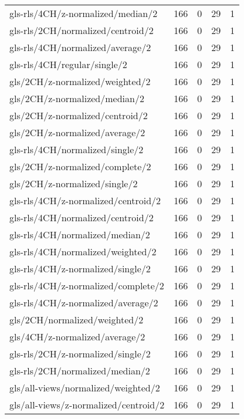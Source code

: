 \begin{longtable}{lrrrr}
    gls-rls/4CH/z-normalized/median/2         & 166 &  0 & 29 &  1 \\
    gls-rls/2CH/normalized/centroid/2         & 166 &  0 & 29 &  1 \\
    gls-rls/4CH/normalized/average/2          & 166 &  0 & 29 &  1 \\
    gls-rls/4CH/regular/single/2              & 166 &  0 & 29 &  1 \\
    gls/2CH/z-normalized/weighted/2           & 166 &  0 & 29 &  1 \\
    gls/2CH/z-normalized/median/2             & 166 &  0 & 29 &  1 \\
    gls/2CH/z-normalized/centroid/2           & 166 &  0 & 29 &  1 \\
    gls/2CH/z-normalized/average/2            & 166 &  0 & 29 &  1 \\
    gls-rls/4CH/normalized/single/2           & 166 &  0 & 29 &  1 \\
    gls/2CH/z-normalized/complete/2           & 166 &  0 & 29 &  1 \\
    gls/2CH/z-normalized/single/2             & 166 &  0 & 29 &  1 \\
    gls-rls/4CH/z-normalized/centroid/2       & 166 &  0 & 29 &  1 \\
    gls-rls/4CH/normalized/centroid/2         & 166 &  0 & 29 &  1 \\
    gls-rls/4CH/normalized/median/2           & 166 &  0 & 29 &  1 \\
    gls-rls/4CH/normalized/weighted/2         & 166 &  0 & 29 &  1 \\
    gls-rls/4CH/z-normalized/single/2         & 166 &  0 & 29 &  1 \\
    gls-rls/4CH/z-normalized/complete/2       & 166 &  0 & 29 &  1 \\
    gls-rls/4CH/z-normalized/average/2        & 166 &  0 & 29 &  1 \\
    gls/2CH/normalized/weighted/2             & 166 &  0 & 29 &  1 \\
    gls/4CH/z-normalized/average/2            & 166 &  0 & 29 &  1 \\
    gls-rls/2CH/z-normalized/single/2         & 166 &  0 & 29 &  1 \\
    gls-rls/2CH/normalized/median/2           & 166 &  0 & 29 &  1 \\
    gls/all-views/normalized/weighted/2       & 166 &  0 & 29 &  1 \\
    gls/all-views/z-normalized/centroid/2     & 166 &  0 & 29 &  1 \\

\end{longtable}
